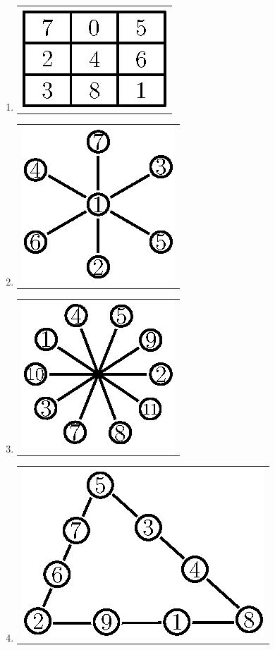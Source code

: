 \begin{enumerate}
\item 
\begin{tabular}[c]{c}
\centering
\includegraphics{src/figures/ans18.eps}
\end{tabular}

\item 
\begin{tabular}[c]{c}
\centering
\includegraphics{src/figures/ans19.eps}
\end{tabular}

\item 
\begin{tabular}[c]{c}
\centering
\includegraphics{src/figures/ans20.eps}
\end{tabular}

\item 
\begin{tabular}[c]{c}
\centering
\includegraphics{src/figures/ans21.eps}
\end{tabular}


\end{enumerate}
